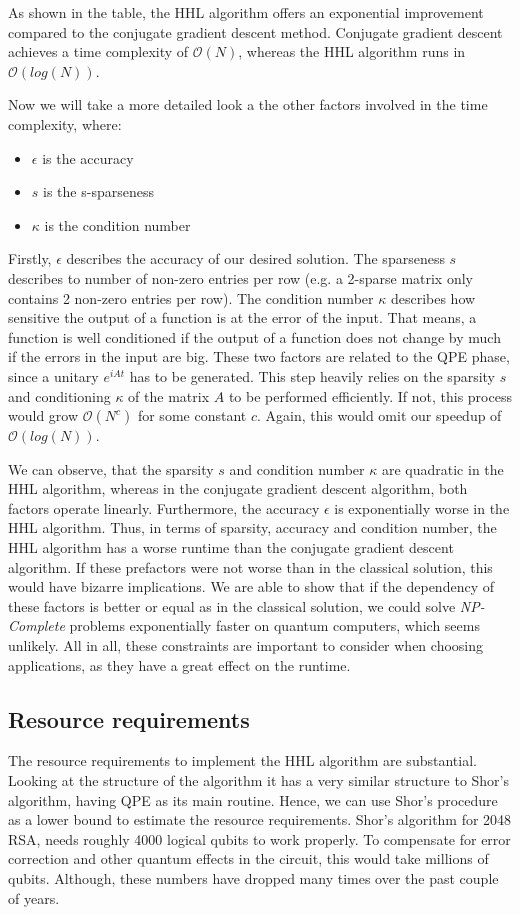 As shown in the table, the HHL algorithm offers an exponential improvement compared to the conjugate gradient descent method.
Conjugate gradient descent achieves a time complexity of $\mathcal{O}(N)$, whereas the HHL algorithm runs in $\mathcal{O}(log(N))$.

Now we will take a more detailed look a the other factors involved in the time complexity, where:
\begin{itemize}
    \item $\epsilon$ is the accuracy
    \item $s$ is the s-sparseness
    \item $\kappa$ is the condition number
\end{itemize}

Firstly, $\epsilon$ describes the accuracy of our desired solution.
The sparseness $s$ describes to number of non-zero entries per row
(e.g. a 2-sparse matrix only contains 2 non-zero entries per row).
The condition number $\kappa$ describes how sensitive the output of a function is at the error of the input.
That means, a function is well conditioned if the output of a function does not change by much if the errors in the input are big.
These two factors are related to the QPE phase, since a unitary $e^{iAt}$ has to be generated. 
This step heavily relies on the sparsity $s$ and conditioning $\kappa$ of the matrix $A$ to be performed efficiently.
If not, this process would grow $\mathcal{O}(N^c)$ for some constant $c$.
Again, this would omit our speedup of $\mathcal{O}(log(N))$.

We can observe, that the sparsity $s$ and condition number $\kappa$ are quadratic in the HHL algorithm, whereas in the conjugate gradient descent algorithm, both factors operate linearly.
Furthermore, the accuracy $\epsilon$ is exponentially worse in the HHL algorithm. 
Thus, in terms of sparsity, accuracy and condition number, the HHL algorithm has a worse runtime than the conjugate gradient descent algorithm.
If these prefactors were not worse than in the classical solution, this would have bizarre implications. 
We are able to show that if the dependency of these factors is better or equal as in the classical solution, we could solve \textit{NP-Complete} problems exponentially faster on quantum computers, which seems unlikely.
All in all, these constraints are important to consider when choosing applications, as they have a great effect on the runtime. 


\subsection{Resource requirements}
The resource requirements to implement the HHL algorithm are substantial.
Looking at the structure of the algorithm it has a very similar structure to Shor's algorithm, having QPE as its main routine.
Hence, we can use Shor's procedure as a lower bound to estimate the resource requirements.
Shor's algorithm for 2048 RSA, needs roughly 4000 logical qubits to work properly. 
To compensate for error correction and other quantum effects in the circuit, this would take millions of qubits. 
Although, these numbers have dropped many times over the past couple of years.
